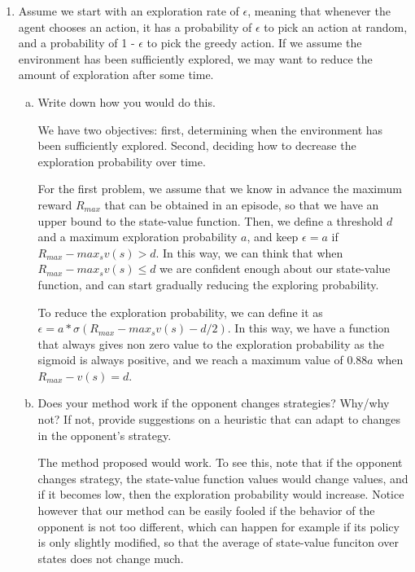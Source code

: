 \documentclass{exam}
\begin{document}
\begin{problem}[Introduction]
\begin{enumerate}
\begin{itemize}[(a)]
    \end{itemize}
    \item Assume we start with an exploration rate of $\epsilon$, meaning that whenever the agent chooses an action, it has a probability of $\epsilon$ to pick an action at random, and a probability of 1 - $\epsilon$ to pick the greedy action. If we assume the environment has been sufficiently explored, we may want to reduce the amount of exploration after some time.
    
    \begin{enumerate}[(a)]
        \item  Write down how you would do this.
        \begin{solutionorlines}[2in]
            We have two objectives: first, determining when the environment has been sufficiently explored. Second, deciding how to decrease the exploration probability over time.
            
            For the first problem, we assume that we know in advance the maximum reward $R_{max}$ that can be obtained in an episode, so that we have an upper bound to the state-value function. Then, we define a threshold $d$ and a maximum exploration probability $a$, and keep $\epsilon = a$ if $R_{max} - max_s v(s) > d$. In this way, we can think that when $R_{max} - max_s v(s) \le d$ we are confident enough about our state-value function, and can start gradually reducing the exploring probability.
            
            To reduce the exploration probability, we can define it as $\epsilon = a * \sigma  (R_{max} - max_s v(s) - d/2)$. In this way, we have a function that always gives non zero value to the exploration probability as the sigmoid is always positive, and we reach a maximum value of $0.88a$ when $R_{max} - v(s) = d$.
            
        \end{solutionorlines}

        \item
        Does your method work if the opponent changes strategies? Why/why not? If not, provide suggestions on a heuristic that can adapt to changes in the opponent’s strategy.
                \begin{solutionorlines}[2in]
                    The method proposed would work. To see this, note that if the opponent changes strategy, the state-value function values would change values, and if it becomes low, then the exploration probability would increase. Notice however that our method can be easily fooled if the behavior of the opponent is not too different, which can happen for example if its policy is only slightly modified, so that the average of state-value funciton over states does not change much.
        \end{solutionorlines}
    \end{enumerate}

\end{enumerate}

\end{problem}
\end{document}
